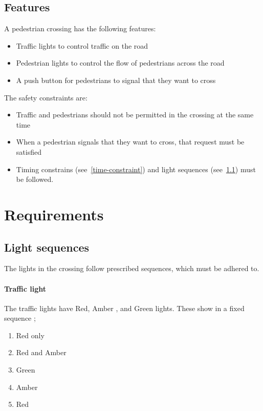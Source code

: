 \documentclass{article}
\begin{document}
\subsection{Features}
A pedestrian crossing has the following features:
\begin{itemize}
	\item Traffic lights to control traffic on the road
	\item Pedestrian lights to control the flow of pedestrians across the road
	\item A push button for pedestrians to signal that they want to cross
\end{itemize}
The safety constraints are:
\begin{itemize}
	\item Traffic and pedestrians should not be permitted in the crossing at
		the same time
	\item When a pedestrian signals that they want to cross, that request must
		be satisfied
	\item Timing constrains (see~\ref{time-constraint}) and light
		sequences (see~\ref{light-sequence}) must be followed.
\end{itemize}

\section{Requirements}

\subsection{Light sequences}\label{light-sequence}
The lights in the crossing follow prescribed sequences, which must be adhered
to.
\paragraph{Traffic light}
The traffic lights have Red, Amber
, and
Green lights.  These show in a fixed sequence \citep[Schedule 14, para 4.2]{tsrgd};
\begin{enumerate}
\setlength{\itemsep}{-3pt}
	\item Red only
	\item Red and Amber
	\item Green
	\item Amber
	\item Red
\end{enumerate}
\end{document}
